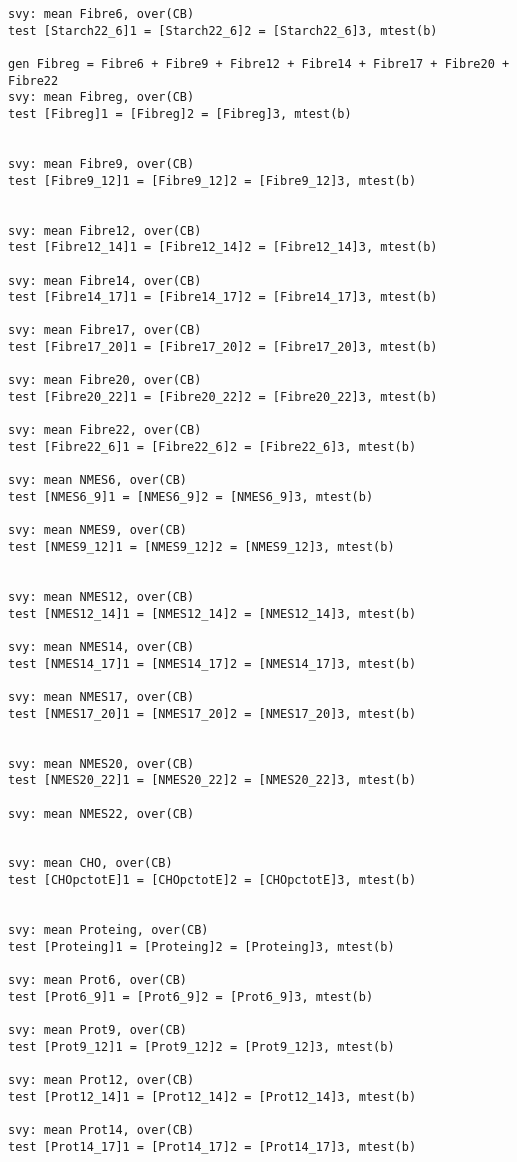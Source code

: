 \begin{verbatim}
svy: mean Fibre6, over(CB)
test [Starch22_6]1 = [Starch22_6]2 = [Starch22_6]3, mtest(b) 

gen Fibreg = Fibre6 + Fibre9 + Fibre12 + Fibre14 + Fibre17 + Fibre20 + Fibre22
svy: mean Fibreg, over(CB)
test [Fibreg]1 = [Fibreg]2 = [Fibreg]3, mtest(b) 


svy: mean Fibre9, over(CB)
test [Fibre9_12]1 = [Fibre9_12]2 = [Fibre9_12]3, mtest(b) 


svy: mean Fibre12, over(CB)
test [Fibre12_14]1 = [Fibre12_14]2 = [Fibre12_14]3, mtest(b) 

svy: mean Fibre14, over(CB)
test [Fibre14_17]1 = [Fibre14_17]2 = [Fibre14_17]3, mtest(b) 

svy: mean Fibre17, over(CB)
test [Fibre17_20]1 = [Fibre17_20]2 = [Fibre17_20]3, mtest(b) 

svy: mean Fibre20, over(CB)
test [Fibre20_22]1 = [Fibre20_22]2 = [Fibre20_22]3, mtest(b) 

svy: mean Fibre22, over(CB)
test [Fibre22_6]1 = [Fibre22_6]2 = [Fibre22_6]3, mtest(b) 

svy: mean NMES6, over(CB)
test [NMES6_9]1 = [NMES6_9]2 = [NMES6_9]3, mtest(b) 

svy: mean NMES9, over(CB)
test [NMES9_12]1 = [NMES9_12]2 = [NMES9_12]3, mtest(b) 


svy: mean NMES12, over(CB)
test [NMES12_14]1 = [NMES12_14]2 = [NMES12_14]3, mtest(b) 

svy: mean NMES14, over(CB)
test [NMES14_17]1 = [NMES14_17]2 = [NMES14_17]3, mtest(b) 

svy: mean NMES17, over(CB)
test [NMES17_20]1 = [NMES17_20]2 = [NMES17_20]3, mtest(b) 


svy: mean NMES20, over(CB)
test [NMES20_22]1 = [NMES20_22]2 = [NMES20_22]3, mtest(b) 

svy: mean NMES22, over(CB)


svy: mean CHO, over(CB)
test [CHOpctotE]1 = [CHOpctotE]2 = [CHOpctotE]3, mtest(b) 


svy: mean Proteing, over(CB)
test [Proteing]1 = [Proteing]2 = [Proteing]3, mtest(b) 

svy: mean Prot6, over(CB)
test [Prot6_9]1 = [Prot6_9]2 = [Prot6_9]3, mtest(b) 

svy: mean Prot9, over(CB)
test [Prot9_12]1 = [Prot9_12]2 = [Prot9_12]3, mtest(b) 

svy: mean Prot12, over(CB)
test [Prot12_14]1 = [Prot12_14]2 = [Prot12_14]3, mtest(b) 

svy: mean Prot14, over(CB)
test [Prot14_17]1 = [Prot14_17]2 = [Prot14_17]3, mtest(b) 


\end{verbatim}
